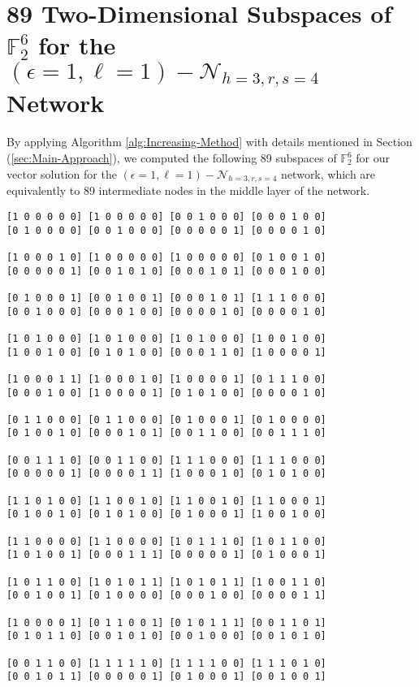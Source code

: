 \section{89 Two-Dimensional Subspaces of $\ensuremath{\mathbb{F}}_{2}^{6}$
for the $\left(\epsilon=1,\ell=1\right)-\mathcal{N}_{h=3,r,s=4}$
Network \label{sec:89-Two-Dimensional-Subspaces}}

By applying Algorithm \vref{alg:Increasing-Method} with details mentioned
in Section (\ref{sec:Main-Approach}), we computed the following 89
subspaces of $\ensuremath{\mathbb{F}}_{2}^{6}$ for our vector solution
for the $\left(\epsilon=1,\ell=1\right)-\mathcal{N}_{h=3,r,s=4}$
network, which are equivalently to 89 intermediate nodes in the middle
layer of the network.

\begin{lstlisting}
[1 0 0 0 0 0] [1 0 0 0 0 0] [0 0 1 0 0 0] [0 0 0 1 0 0] 
[0 1 0 0 0 0] [0 0 1 0 0 0] [0 0 0 0 0 1] [0 0 0 0 1 0] 

[1 0 0 0 1 0] [1 0 0 0 0 0] [1 0 0 0 0 0] [0 1 0 0 1 0] 
[0 0 0 0 0 1] [0 0 1 0 1 0] [0 0 0 1 0 1] [0 0 0 1 0 0] 

[0 1 0 0 0 1] [0 0 1 0 0 1] [0 0 0 1 0 1] [1 1 1 0 0 0] 
[0 0 1 0 0 0] [0 0 0 1 0 0] [0 0 0 0 1 0] [0 0 0 0 1 0] 

[1 0 1 0 0 0] [1 0 1 0 0 0] [1 0 1 0 0 0] [1 0 0 1 0 0] 
[1 0 0 1 0 0] [0 1 0 1 0 0] [0 0 0 1 1 0] [1 0 0 0 0 1] 

[1 0 0 0 1 1] [1 0 0 0 1 0] [1 0 0 0 0 1] [0 1 1 1 0 0] 
[0 0 0 1 0 0] [1 0 0 0 0 1] [0 1 0 1 0 0] [0 0 0 0 1 0] 

[0 1 1 0 0 0] [0 1 1 0 0 0] [0 1 0 0 0 1] [0 1 0 0 0 0] 
[0 1 0 0 1 0] [0 0 0 1 0 1] [0 0 1 1 0 0] [0 0 1 1 1 0] 

[0 0 1 1 1 0] [0 0 1 1 0 0] [1 1 1 0 0 0] [1 1 1 0 0 0] 
[0 0 0 0 0 1] [0 0 0 0 1 1] [1 0 0 0 1 0] [0 1 0 1 0 0] 

[1 1 0 1 0 0] [1 1 0 0 1 0] [1 1 0 0 1 0] [1 1 0 0 0 1] 
[0 1 0 0 1 0] [0 1 0 1 0 0] [0 1 0 0 0 1] [1 0 0 1 0 0] 

[1 1 0 0 0 0] [1 1 0 0 0 0] [1 0 1 1 1 0] [1 0 1 1 0 0] 
[1 0 1 0 0 1] [0 0 0 1 1 1] [0 0 0 0 0 1] [0 1 0 0 0 1] 

[1 0 1 1 0 0] [1 0 1 0 1 1] [1 0 1 0 1 1] [1 0 0 1 1 0] 
[0 0 1 0 0 1] [0 1 0 0 0 0] [0 0 0 1 0 0] [0 0 0 0 1 1] 

[1 0 0 0 0 1] [0 1 1 0 0 1] [0 1 0 1 1 1] [0 0 1 1 0 1] 
[0 1 0 1 1 0] [0 0 1 0 1 0] [0 0 1 0 0 0] [0 0 1 0 1 0] 

[0 0 1 1 0 0] [1 1 1 1 1 0] [1 1 1 1 0 0] [1 1 1 0 1 0] 
[0 0 1 0 1 1] [0 0 0 0 0 1] [0 1 0 0 0 1] [0 0 1 0 0 1] 


\end{lstlisting}
